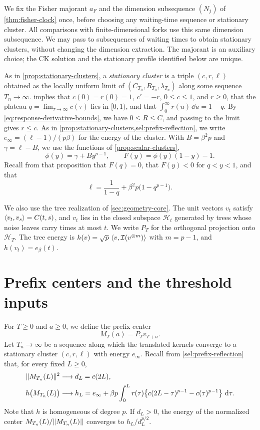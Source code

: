 We fix the Fisher majorant $a_F$ and the dimension subsequence $(N_j)$ of \cref{thm:fisher-clock} once, before choosing any waiting-time sequence or stationary cluster. All comparisons with finite-dimensional forks use this same dimension subsequence. We may pass to subsequences of waiting times to obtain stationary clusters, without changing the dimension extraction. The majorant is an auxiliary choice; the CK solution and the stationary profile identified below are unique.

As in \cref{prop:stationary-clusters}, a \emph{stationary cluster} is a triple $(c,r,\ell)$ obtained as the locally uniform limit of $(C_{T_n},R_{T_n},\lambda_{T_n})$ along some sequence $T_n\to\infty$.  implies that $c(0)=r(0)=1$, $c'=-r$, $0\le c\le1$, and $r\ge0$, that the plateau $q=\lim_{\tau\to\infty}c(\tau)$ lies in $[0,1)$, and that $\int_0^\infty r(u)\,\dd u=1-q$. By \eqref{eq:response-derivative-bounds}, we have $0\le R\le C$, and passing to the limit gives $r\le c$. As in \cref{prop:stationary-clusters,sel:prefix-reflection}, we write $e_\infty=(\ell-1)/(p\beta)$ for the energy of the cluster. With $B=\beta^2p$ and $\gamma=\ell-B$, we use the functions of \cref{prop:scalar-clusters},
\[
 \phi(y)=\gamma+By^{p-1},\qquad F(y)=\phi(y)(1-y)-1.
\]
Recall from that proposition that $F(q)=0$, that $F(y)<0$ for $q<y<1$, and that
\[
 \ell=\frac1{1-q}+\beta^2p\bigl(1-q^{p-1}\bigr).
\]

We also use the tree realization of \cref{sec:geometry-core}. The unit vectors $v_t$ satisfy $\left\langle v_t,v_s\right\rangle=C(t,s)$, and $v_t$ lies in the closed subspace $\mathcal H_t$ generated by trees whose noise leaves carry times at most $t$. We write $P_T$ for the orthogonal projection onto $\mathcal H_T$. The tree energy is $h(v)=\sqrt p\,\left\langle v,\mathcal I(v^{\otimes m})\right\rangle$ with $m=p-1$, and $h(v_t)=e_\beta(t)$.

\section{Prefix centers and the threshold inputs}\label{sec:threshold-inputs}

For $T\ge0$ and $a\ge0$, we define the prefix center
\[
 M_T(a)=P_Tv_{T+a}.
\]
Let $T_n\to\infty$ be a sequence along which the translated kernels converge to a stationary cluster $(c,r,\ell)$ with energy $e_\infty$. Recall from \cref{sel:prefix-reflection} that, for every fixed $L\ge0$,
\[
\begin{aligned}
 \lVert M_{T_n}(L)\rVert^2&\longrightarrow d_L=c(2L),\\
 h\bigl(M_{T_n}(L)\bigr)&\longrightarrow
 h_L=e_\infty+\beta p\int_0^Lr(\tau)\bigl\{c(2L-\tau)^{p-1}-c(\tau)^{p-1}\bigr\}\,\mathop{}\!\mathrm d\tau.
\end{aligned}
\]
Note that $h$ is homogeneous of degree $p$. If $d_L>0$, the energy of the normalized center $M_{T_n}(L)/\lVert M_{T_n}(L)\rVert$ converges to $h_L/d_L^{p/2}$.

